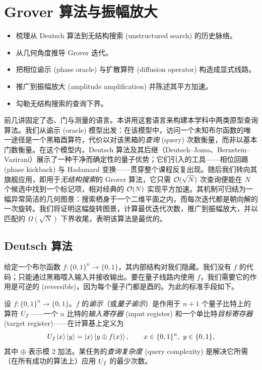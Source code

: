 \chapter{Grover 算法与振幅放大}
\label{ch:lec03}

\begin{objectives}
\begin{itemize}[leftmargin=1.4em,nosep]
  \item 梳理从 Deutsch 算法到无结构搜索 (unstructured search) 的历史脉络。
  \item 从几何角度推导 Grover 迭代。
  \item 把相位谕示 (phase oracle) 与扩散算符 (diffusion operator) 构造成显式线路。
  \item 推广到振幅放大 (amplitude amplification) 并陈述其平方加速。
  \item 勾勒无结构搜索的查询下界。
\end{itemize}
\end{objectives}


前几讲固定了态、门与测量的语言。本讲用这套语言来构建本学科中两类原型查询算法。我们从谕示 (oracle) 模型出发：在该模型中，访问一个未知布尔函数的唯一途径是一个黑箱酉算符，代价以对该黑箱的\emph{查询} (query) 次数衡量，而非以基本门数衡量。在这个模型内，Deutsch 算法及其后继（Deutsch--Jozsa、Bernstein--Vazirani）展示了一种干净而确定性的量子优势；它们引入的工具——相位回踢 (phase kickback) 与 Hadamard 变换——贯穿整个课程反复出现。随后我们转向其旗舰应用，即用于\emph{无结构搜索}的 Grover 算法，它只需 $\mathcal{O}(\sqrt N)$ 次查询便能在 $N$ 个候选中找到一个标记项，相对经典的 $\mathcal{O}(N)$ 实现平方加速。其机制可归结为一幅异常简洁的几何图景：搜索栖身于一个二维平面之内，而每次迭代都是朝向解的一次旋转。我们将证明这幅旋转图景，计算最优迭代次数，推广到振幅放大，并以匹配的 $\Omega(\sqrt N)$ 下界收尾，表明该算法是最优的。

\section{Deutsch 算法}
\label{sec:lec03-1}

给定一个布尔函数 $f:\{0,1\}^n\to\{0,1\}$，其内部结构对我们隐藏。我们没有 $f$ 的代码；只能通过黑箱喂入输入并接收输出。要在量子线路内使用 $f$，我们需要它的作用是可逆的 (reversible)，因为每个量子门都是酉的。为此的标准手段如下。

\begin{definition}[谕示 / 查询模型]
\label{def:lec03-oracle}
设 $f:\{0,1\}^n\to\{0,1\}$。$f$ 的\emph{谕示}（或\emph{量子谕示}）是作用于 $n+1$ 个量子比特上的算符 $U_{f}$——一个 $n$ 比特的\emph{输入寄存器} (input register) 和一个单比特\emph{目标寄存器} (target register)——在计算基上定义为
\[
  U_{f}\ket{x}\ket{y}=\ket{x}\ket{y\oplus f(x)},
  \qquad x\in\{0,1\}^n,\ y\in\{0,1\},
\]
其中 $\oplus$ 表示模 $2$ 加法。某任务的\emph{查询复杂度} (query complexity) 是解决它所需（在所有成功的算法上）应用 $U_{f}$ 的最少次数。

\end{definition}

